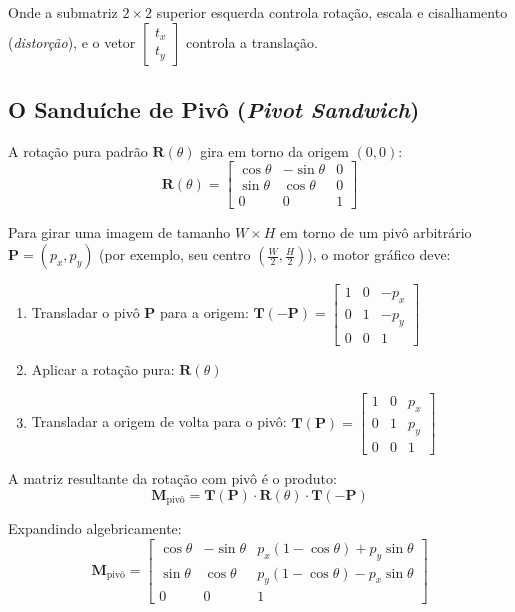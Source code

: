\documentclass[12pt,a4paper]{article}
\begin{document}
Onde a submatriz $2 \times 2$ superior esquerda controla rotação, escala e cisalhamento (\textit{distorção}), e o vetor $\begin{bmatrix} t_x \\ t_y \end{bmatrix}$ controla a translação.

\subsection{O Sanduíche de Pivô (\textit{Pivot Sandwich})}

A rotação pura padrão $\mathbf{R}(\theta)$ gira em torno da origem $(0, 0)$:
\begin{equation}
\mathbf{R}(\theta) = \begin{bmatrix} \cos\theta & -\sin\theta & 0 \\ \sin\theta & \cos\theta & 0 \\ 0 & 0 & 1 \end{bmatrix}
\end{equation}

Para girar uma imagem de tamanho $W \times H$ em torno de um pivô arbitrário $\mathbf{P} = (p_x, p_y)$ (por exemplo, seu centro $(\frac{W}{2}, \frac{H}{2})$), o motor gráfico deve:
\begin{enumerate}
    \item Transladar o pivô $\mathbf{P}$ para a origem: $\mathbf{T}(-\mathbf{P}) = \begin{bmatrix} 1 & 0 & -p_x \\ 0 & 1 & -p_y \\ 0 & 0 & 1 \end{bmatrix}$
    \item Aplicar a rotação pura: $\mathbf{R}(\theta)$
    \item Transladar a origem de volta para o pivô: $\mathbf{T}(\mathbf{P}) = \begin{bmatrix} 1 & 0 & p_x \\ 0 & 1 & p_y \\ 0 & 0 & 1 \end{bmatrix}$
\end{enumerate}

A matriz resultante da rotação com pivô é o produto:
\begin{equation}
\mathbf{M}_{\text{pivô}} = \mathbf{T}(\mathbf{P}) \cdot \mathbf{R}(\theta) \cdot \mathbf{T}(-\mathbf{P})
\end{equation}

Expandindo algebricamente:
\begin{equation}
\mathbf{M}_{\text{pivô}} = \begin{bmatrix} 
\cos\theta & -\sin\theta & p_x(1 - \cos\theta) + p_y\sin\theta \\
\sin\theta & \cos\theta & p_y(1 - \cos\theta) - p_x\sin\theta \\
0 & 0 & 1
\end{bmatrix}
\end{equation}
\end{document}
